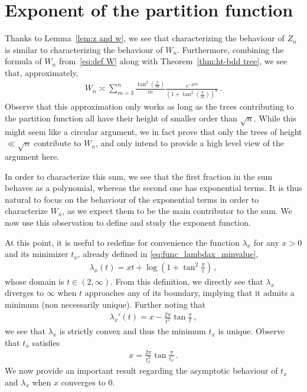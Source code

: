 \documentclass{article}
\newcommand{\1}{\mathbbm{1}}								%
\theoremstyle{definition}
\numberwithin{equation}{section}
\begin{document}
\section{Exponent of the partition function}\label{sec:on part fun}



Thanks to Lemma~\ref{lem:z and w}, we see that characterizing the behaviour of $Z_n$ is similar to characterizing the behaviour of $W_n$.
Furthermore, combining the formula of $W_n$ from~\eqref{eq:def W} along with Theorem~\ref{thm:ht-bdd tree}, we see that, approximately,
\begin{align*}
    W_n\asymp \sum_{m=3}^n\frac{\tan^2\left(\frac{\pi}{m}\right)}{m}\frac{e^{-\mu m}}{\left(1+\tan^2\left(\frac{\pi}{m}\right)\right)^n}\,.
\end{align*}
Observe that this approximation only works as long as the trees contributing to the partition function all have their height of smaller order than $\sqrt{n}$.
While this might seem like a circular argument, we in fact prove that only the trees of height $\ll\sqrt{n}$ contribute to $W_n$, and only intend to provide a high level view of the argument here.

In order to characterize this sum, we see that the first fraction in the sum behaves as a polynomial, whereas the second one has exponential terms.
It is thus natural to focus on the behaviour of the exponential terms in order to characterize $W_n$, as we expect them to be the main contributor to the sum.
We now use this observation to define and study the exponent function.

{At this point, it is useful to redefine for convenience the function $\lambda_x$ for any $x>0$ and its minimizer $t_x$, already defined in \eqref{eq:func_lambdax_minvalue}},
\begin{align}\label{eq:lx}
    \lambda_x(t)=xt+\log\left(1+\tan^2\frac{\pi}{t}\right)\,,
\end{align}
whose domain is $t\in(2,\infty)$.
From this definition, we directly see that $\lambda_x$ diverges to $\infty$ when $t$ approaches any of its boundary, implying that it admits a minimum (non necessarily unique).
Further noting that
\begin{align*}
    \lambda_x'(t)=x-\frac{2\pi}{t^2}\tan\frac{\pi}{t}\,,
\end{align*}
we see that $\lambda_x$ is strictly convex and thus the minimum $t_x$ is unique. Observe that $t_x$ satisfies
\begin{align*}
    x=\frac{2\pi}{t_x^2}\tan\frac{\pi}{t_x}\,.
\end{align*}
We now provide an important result regarding the asymptotic behaviour of $t_x$ and $\lambda_x$ when $x$ converges to $0$.
\end{document}
